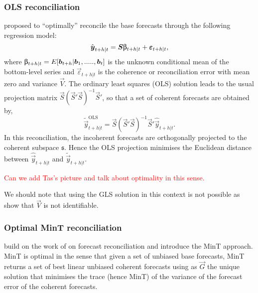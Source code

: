 \documentclass[graybox]{svmult}
\begin{document}
\subsubsection{OLS reconciliation}

\cite{HynEtAl2011} proposed to ``optimally'' reconcile the base forecasts through the following regression model:
\begin{equation}\label{eq:OLS}
\hat{\vec{y}}_{t+h|t} = \vec{S\ubeta}_{t+h|t} + \vec{\varepsilon}_{t+h|t},
\end{equation}
where $\vec{\ubeta}_{t+h|t}=E[\vec{b}_{t+h}|\vec{b}_1,.....,\vec{b}_t]$ is the unknown conditional mean of the bottom-level series and $\vec{\varepsilon}_{t+h|t}$ is the coherence or reconciliation error with mean zero and variance $\vec{V}$. The ordinary least squares (OLS) solution leads to the usual projection matrix $\vec{S}(\vec{S}'\vec{S})^{-1}\vec{S}'$, so that a set of coherent forecasts are obtained by,
\begin{equation*}
\tilde{\vec{y}}_{t+h|t}^{\text{OLS}} = \vec{S}(\vec{S}'\vec{S})^{-1}\vec{S}'\hat{\vec{y}}_{t+h|t}.
\end{equation*}
In this reconciliation, the incoherent forecasts are orthogonally projected to the coherent subspace $\mathfrak{s}$. Hence the OLS projection minimises the Euclidean distance between $\hat{\vec{y}}_{t+h|t}$ and $\tilde{\vec{y}}_{t+h|t}$.

\textcolor{red}{Can we add Tas's picture and talk about optimality in this sense.}

We should note that using the GLS solution in this context is not possible as \cite{WicEtAl2019} show that $\vec{V}$ is not identifiable.


\subsubsection{Optimal MinT reconciliation}

\cite{WicEtAl2019} build on the work of \citet{HynEtAl2011} on forecast reconciliation and introduce the MinT approach. MinT is optimal in the sense that given a set of unbiased base forecasts, MinT returns a set of best linear unbiased coherent forecasts using as $\vec{G}$ the unique solution that minimises the trace (hence MinT) of the variance of the forecast error of the coherent forecasts.
\end{document}
